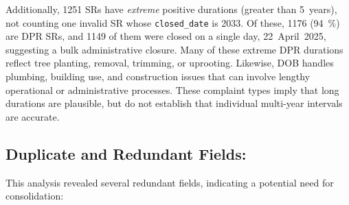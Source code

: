 \documentclass[linenumber]{jdsart}
\begin{document}
Additionally,  \num{1251} SRs have \emph{extreme} positive durations (greater than
5~years), not counting one invalid SR whose \texttt{closed\_date} is 2033.  
Of these, \num{1176} (\SI{94}{\percent}) are DPR SRs, and \num{1149} of 
them were closed on a single day, 22~April~2025, suggesting 
a bulk administrative closure. Many of these extreme DPR durations
reflect tree planting, removal, trimming, or uprooting. Likewise,
DOB handles plumbing, building use, and construction issues that can
involve lengthy operational or administrative processes. 
These complaint types imply that long durations are plausible, but 
do not establish that individual multi-year intervals are accurate.



\subsection{Duplicate and Redundant Fields:}
\label{sec:redundant} 
This analysis revealed several redundant fields, indicating a 
potential need for consolidation:
\end{document}
